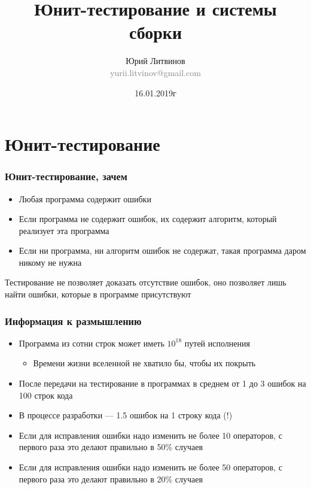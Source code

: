 \documentclass[xetex,mathserif,serif]{beamer}
\title{Юнит-тестирование и системы сборки}
\author[Юрий Литвинов]{Юрий Литвинов\\\small{\textcolor{gray}{yurii.litvinov@gmail.com}}}
\date{16.01.2019г}
\begin{document}
	\frame{\titlepage}

	\section{Юнит-тестирование}

	\begin{frame}
		\frametitle{Юнит-тестирование, зачем}
		\begin{itemize}
			\item Любая программа содержит ошибки
			\item Если программа не содержит ошибок, их содержит алгоритм, который реализует эта программа
			\item Если ни программа, ни алгоритм ошибок не содержат, такая программа даром никому не нужна
		\end{itemize}
		Тестирование не позволяет доказать отсутствие ошибок, оно позволяет лишь найти ошибки, которые в программе присутствуют
	\end{frame}

	\begin{frame}
		\frametitle{Информация к размышлению}
		\begin{itemize}
			\item Программа из сотни строк может иметь $10^{18}$ путей исполнения
			\begin{itemize}
				\item Времени жизни вселенной не хватило бы, чтобы их покрыть
			\end{itemize}
			\item После передачи на тестирование в программах в среднем от 1 до 3 ошибок на 100 строк кода
			\item В процессе разработки --- 1.5 ошибок на 1 строку кода (!)
			\item Если для исправления ошибки надо изменить не более 10 операторов, с первого раза это делают правильно в 50\% случаев
			\item Если для исправления ошибки надо изменить не более 50 операторов, с первого раза это делают правильно в 20\% случаев
		\end{itemize}
	\end{frame}
\end{document}
